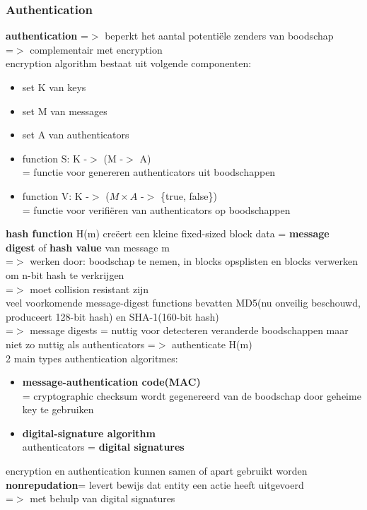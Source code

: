 \documentclass{report}
\begin{document}
\subsubsection{Authentication}
\textbf{authentication} =$>$ beperkt het aantal potenti\"ele zenders van boodschap
\\=$>$ complementair met encryption
\\encryption algorithm bestaat uit volgende componenten:
\begin{itemize}
\item set K van keys
\item set M van messages
\item set A van authenticators
\item function S: K -$>$ (M -$>$ A)
\\= functie voor genereren authenticators uit boodschappen
\item function V: K -$>$ ($M \times A$ -$>$ \{true, false\})
\\= functie voor verifi\"eren van authenticators op boodschappen
\end{itemize}
\textbf{hash function} H(m) cre\"eert een kleine fixed-sized block data = \textbf{message digest} of \textbf{hash value} van message m
\\=$>$ werken door: boodschap te nemen, in blocks opsplisten en blocks verwerken om n-bit hash te verkrijgen
\\=$>$ moet collision resistant zijn
\\veel voorkomende message-digest functions bevatten MD5(nu onveilig beschouwd, produceert 128-bit hash) en SHA-1(160-bit hash)
\\=$>$ message digests = nuttig voor detecteren veranderde boodschappen maar niet zo nuttig als authenticators =$>$ authenticate H(m)
\\2 main types authentication algoritmes:
\begin{itemize}
\item \textbf{message-authentication code(MAC)}
\\= cryptographic checksum wordt gegenereerd van de boodschap door geheime key te gebruiken
\item \textbf{digital-signature algorithm}
\\authenticators = \textbf{digital signatures}

\end{itemize}
encryption en authentication kunnen samen of apart gebruikt worden
\\\textbf{nonrepudation}= levert bewijs dat entity een actie heeft uitgevoerd
\\=$>$ met behulp van digital signatures
\end{document}
